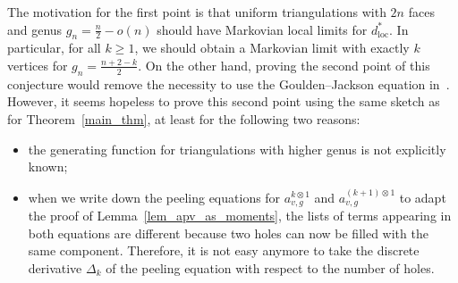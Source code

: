 \documentclass[AHL,Unicode,longabstracts,published]{cedram}
\newcommand{\loc}{\mathrm{loc}}
\begin{document}
The motivation for the first point is that uniform triangulations with $2n$ faces and genus $g_n=\frac{n}{2}-o(n)$ should have Markovian local limits for $d_{\loc}^*$. In particular, for all $k \geq 1$, we should obtain a Markovian limit with exactly $k$ vertices for $g_n=\frac{n+2-k}{2}$. On the other hand, proving the second point of this conjecture would remove the necessity to use the Goulden--Jackson equation in~\cite{BL19}. However, it seems hopeless to prove this second point using the same sketch as for Theorem~\ref{main_thm}, at least for the following two reasons:
\begin{itemize}
\item the generating function for triangulations with higher genus is not explicitly known;
\item when we write down the peeling equations for $a_{v,g}^{k \otimes 1}$ and $a_{v,g}^{(k+1) \otimes 1}$ to adapt the proof of Lemma~\ref{lem_apv_as_moments}, the lists of terms appearing in both equations are different because two holes can now be filled with the same component. Therefore, it is not easy anymore to take the discrete derivative $\Delta_k$ of the peeling equation with respect to the number of holes.
\end{itemize}




\end{document}
